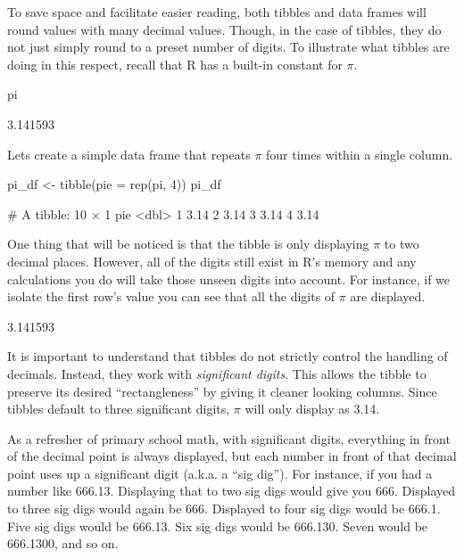 To save space and facilitate easier reading, both tibbles and data frames will round values with many decimal values. Though, in the case of tibbles, they do not just simply round to a preset number of digits.  To illustrate what tibbles are doing in this respect, recall that R has a built-in constant for $\pi$.

\begin{inR}
pi
\end{inR}
\begin{outR}
[1] 3.141593
\end{outR}

\noindent
Lets create a simple data frame that repeats $\pi$ four times within a single column.

\begin{inR}
pi_df <- tibble(pie = rep(pi, 4))
pi_df
\end{inR}
\begin{outR}
# A tibble: 10 × 1
     pie
   <dbl>
 1  3.14
 2  3.14
 3  3.14
 4  3.14
\end{outR}

\noindent
One thing that will be noticed is that the tibble is only displaying $\pi$ to two decimal places. However, all of the digits still exist in R's memory and any calculations you do will take those unseen digits into account. For instance, if we isolate the first row's value you can see that all the digits of $\pi$ are displayed.

\begin{outR}
[1] 3.141593
\end{outR}

\noindent
It is important to understand that tibbles do not strictly control the handling of decimals. Instead, they work with \textit{significant digits}.  This allows the tibble to preserve its desired ``rectangleness'' by giving it cleaner looking columns. Since tibbles default to three significant digits, $\pi$ will only display as 3.14. 

As a refresher of primary school math, with significant digits, everything in front of the decimal point is always displayed, but each number in front of that decimal point uses up a significant digit (a.k.a. a ``sig dig''). For instance, if you had a number like 666.13.  Displaying that to two sig digs would give you 666.  Displayed to three sig digs would again be 666. Displayed to four sig digs would be 666.1. Five sig digs would be 666.13. Six sig digs would be 666.130. Seven would be 666.1300, and so on.


